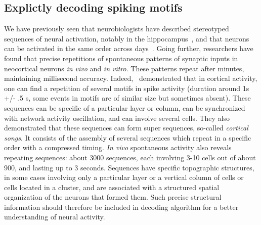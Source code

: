 \documentclass[brainsci, %
               review,submit,pdftex,moreauthors
               ]{Definitions/mdpi}
\begin{document}
\subsection{Explictly decoding spiking motifs}
We have previously seen that neurobiologists have described stereotyped sequences of neural activation, notably in the hippocampus~\citep{pastalkova_internally_2008,villette_internally_2015,malvache_awake_2016}, and that neurons can be activated in the same order across days~\citep{haimerl_internal_2019}. Going further, researchers have found that  precise repetitions of spontaneous patterns of synaptic inputs in neocortical neurons \textit{in vivo} and \textit{in vitro}. These patterns repeat after minutes, maintaining millisecond accuracy. Indeed,~\citet{ikegaya_synfire_2004} demonstrated that in cortical activity, one can find a repetition of several motifs in spike activity (duration around 1s +/- .5 s, some events in motifs are of similar size but sometimes absent). These sequences can be specific of a particular layer or column, can be synchronized with network activity oscillation, and can involve several cells. They also demonstrated that these sequences can form super sequences, so-called \emph{cortical songs}. It consists of the assembly of several sequences which repeat in a specific order with a compressed timing. \emph{In vivo} spontaneous activity also reveals repeating sequences: about 3000 sequences, each involving 3-10 cells out of about 900, and lasting up to 3 seconds. Sequences have specific topographic structures, in some cases involving only a particular layer or a vertical column of cells or cells located in a cluster, and are associated with a structured spatial organization of the neurons that formed them. %
Such precise structural information should therefore be included in decoding algorithm for a better understanding of neural activity.
\end{document}
